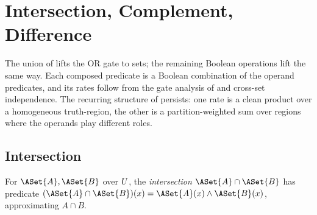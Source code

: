%

\section{Intersection, Complement, Difference}
\label{sec:other-set-ops}

The union of  lifts the OR gate to sets; the
remaining Boolean operations lift the same way. Each composed predicate is a
Boolean combination of the operand predicates, and its rates follow from the
gate analysis of  and cross-set independence. The
recurring structure of  persists: one rate is a
clean product over a homogeneous truth-region, the other is a
partition-weighted sum over regions where the operands play different roles.

\subsection*{Intersection}

\begin{definition}
\label{def:intersection-of-sets}
For $\ASet{A}, \ASet{B}$ over $U$, the \emph{intersection}
$\ASet{A} \cap \ASet{B}$ has predicate $(\ASet{A} \cap \ASet{B})(x) =
\ASet{A}(x) \land \ASet{B}(x)$, approximating $A \cap B$.
\end{definition}


